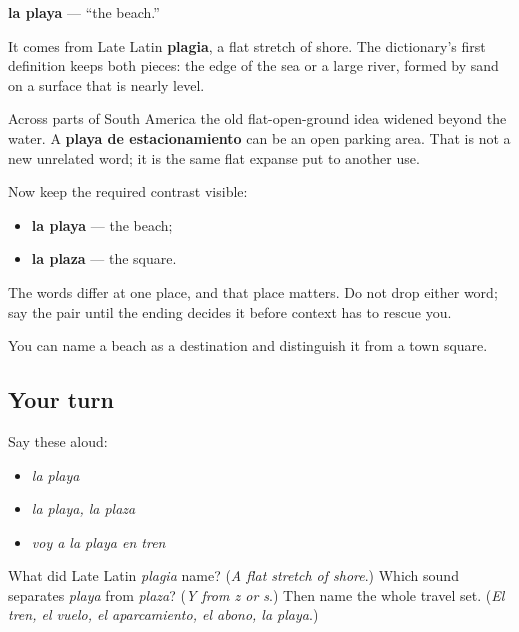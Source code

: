 \begin{cousinweb}
\textbf{la playa} — \textquotedblleft{}the beach.\textquotedblright{}

It comes from Late Latin \textbf{plagia}, a flat stretch of shore. The dictionary's first definition keeps both pieces: the edge of the sea or a large river, formed by sand on a surface that is nearly level.

Across parts of South America the old flat-open-ground idea widened beyond the water. A \textbf{playa de estacionamiento} can be an open parking area. That is not a new unrelated word; it is the same flat expanse put to another use.

Now keep the required contrast visible:

\begin{itemize}
\raggedright
  \item \textbf{la playa} — the beach;
  \item \textbf{la plaza} — the square.
\end{itemize}

The words differ at one place, and that place matters. Do not drop either word; say the pair until the ending decides it before context has to rescue you.
\end{cousinweb}

\begin{grammarlens}[title={What you've built}]
You can name a beach as a destination and distinguish it from a town square.
\end{grammarlens}

\subsection*{Your turn}
Say these aloud:

\begin{itemize}
\raggedright
  \item \emph{la playa}
  \item \emph{la playa, la plaza}
  \item \emph{voy a la playa en tren}
\end{itemize}

\begin{tcolorbox}[breakable,colback=teal!4,colframe=teal!35!black,title={Before you move on}]
What did Late Latin \emph{plagia} name? (\emph{A flat stretch of shore}.) Which sound separates \emph{playa} from \emph{plaza}? (\emph{Y from z or s}.) Then name the whole travel set. (\emph{El tren, el vuelo, el aparcamiento, el abono, la playa}.)
\end{tcolorbox}

